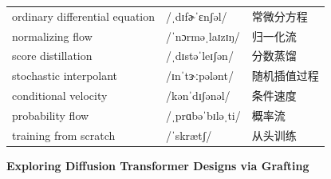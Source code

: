 \documentclass[UTF8,12pt,a4paper]{ctexart}
\providecommand{\zh}[1]{#1}
\begin{document}
\begin{tabular*}{\textwidth}{@{\extracolsep{\fill}}lll@{}}
ordinary differential equation & {\ipafont /ˌdɪfɚˈɛnʃəl/} & \zh{常微分方程} \\
normalizing flow & {\ipafont /ˈnɔrməˌlaɪzɪŋ/} & \zh{归一化流} \\
score distillation & {\ipafont /ˌdɪstəˈleɪʃən/} & \zh{分数蒸馏} \\
stochastic interpolant & {\ipafont /ɪnˈtɝːpələnt/} & \zh{随机插值过程} \\
conditional velocity & {\ipafont /kənˈdɪʃənəl/} & \zh{条件速度} \\
probability flow & {\ipafont /ˌprɑbəˈbɪləˌti/} & \zh{概率流} \\
training from scratch & {\ipafont /ˈskrætʃ/} & \zh{从头训练} \\
\bottomrule
\end{tabular*}

\newpage

\begin{center}
    {\Large\bfseries Exploring Diffusion Transformer Designs via Grafting}
\end{center}
\end{document}
